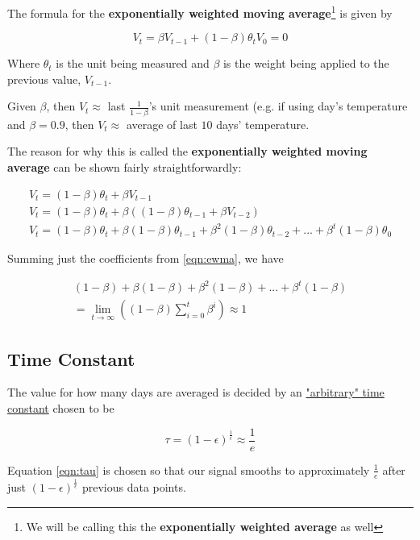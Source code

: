 \documentclass{article}
\begin{document}
The formula for the \textbf{exponentially weighted moving average}\footnote{We will be calling this the \textbf{exponentially weighted average} as well} is given by

\begin{equation}
V_t = \beta V_{t-1} + (1-\beta) \theta_t
V_0 = 0
\end{equation}

Where $\theta_t$ is the unit being measured and $\beta$ is the weight being applied to the previous value, $V_{t-1}$.

Given $\beta$, then $V_t \approx$ last $\frac{1}{1-\beta}$'s unit measurement (e.g. if using day's temperature and $\beta = 0.9$, then $V_t \approx $ average of last $10$ days' temperature.

The reason for why this is called the \textbf{exponentially weighted moving average} can be shown fairly straightforwardly:

\begin{gather}
V_t = (1 - \beta) \theta_t + \beta V_{t-1} \\
V_t = (1 - \beta) \theta_t + \beta ((1-\beta) \theta_{t-1} + \beta V_{t-2}) \\
V_t = (1 - \beta) \theta_t + \beta (1-\beta) \theta_{t-1} + \beta^2 (1-\beta) \theta_{t-2} + ... + \beta^t (1-\beta) \theta_0 \label{eqn:ewma}
\end{gather}

Summing just the coefficients from \ref{eqn:ewma}, we have

\begin{align}
(1-\beta) + \beta(1-\beta) + \beta^2(1-\beta) + ... + \beta^t(1-\beta) \\
= \lim_{t \rightarrow \infty} \left( (1-\beta) \sum_{i=0}^{t} \beta^i \right) \approx 1
\end{align}

\subsection{Time Constant}

The value for how many days are averaged is decided by an \href{https://en.wikipedia.org/wiki/Exponential_smoothing#Time_Constant}{"arbitrary" time constant} chosen to be

\begin{equation}
\tau = (1-\epsilon)^{\frac{1}{\epsilon}} \approx \frac{1}{e} \label{eqn:tau}
\end{equation}

Equation \ref{eqn:tau} is chosen so that our signal smooths to approximately $\frac{1}{e}$ after just $(1-\epsilon)^\frac{1}{\epsilon}$ previous data points.
\end{document}
